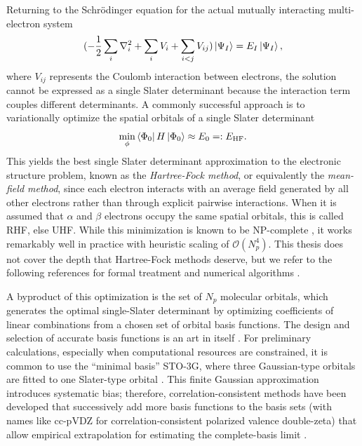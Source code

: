 \documentclass[../main.tex]{subfiles}
\begin{document}
Returning to the Schrödinger equation for the actual mutually interacting multi-electron system
\begin{equation}
    ( -\frac{1}{2} \sum_i \nabla^2_i + \sum_i V_i + \sum_{i<j} V_{ij} ) \ket{\Psi_I} = E_I \ket{\Psi_I},
\end{equation} where $V_{ij}$ represents the Coulomb interaction between electrons, the solution cannot be expressed as a single Slater determinant because the interaction term couples different determinants. A commonly successful approach is to variationally optimize the spatial orbitals of a single Slater determinant
\begin{equation}
    \min_\phi \bra{\Phi_0} H \ket{\Phi_0} \approx E_0 =: E_\mathrm{HF}.
\end{equation} This yields the best single Slater determinant approximation to the electronic structure problem, known as the \textit{Hartree-Fock method}, or equivalently the \textit{mean-field method}, since each electron interacts with an average field generated by all other electrons rather than through explicit pairwise interactions. When it is assumed that $\alpha$ and $\beta$ electrons occupy the same spatial orbitals, this is called \ac{RHF}, else \ac{UHF}. While this minimization is known to be NP-complete \cite{whitfield2012computational}, it works remarkably well in practice with heuristic scaling of $\mathcal{O}(N_p^4)$. This thesis does not cover the depth that Hartree-Fock methods deserve, but we refer to the following references for formal treatment and numerical algorithms \cite{hartree1928the, fock1930naherungsmethode, davidson1975the, pulay1980convergence}.

A byproduct of this optimization is the set of $N_p$ molecular orbitals, which generates the optimal single-Slater determinant by optimizing coefficients of linear combinations from a chosen set of orbital basis functions. The design and selection of accurate basis functions is an art in itself \cite{lehtola2019a, mahamiya2022benchmarking}. For preliminary calculations, especially when computational resources are constrained, it is common to use the ``minimal basis'' STO-3G, where three Gaussian-type orbitals are fitted to one Slater-type orbital \cite{slater1930atomic}. This finite Gaussian approximation introduces systematic bias; therefore, correlation-consistent methods have been developed that successively add more basis functions to the basis sets (with names like cc-pVDZ for correlation-consistent polarized valence double-zeta) that allow empirical extrapolation for estimating the complete-basis limit \cite{dunning1989gaussian}.
\end{document}
